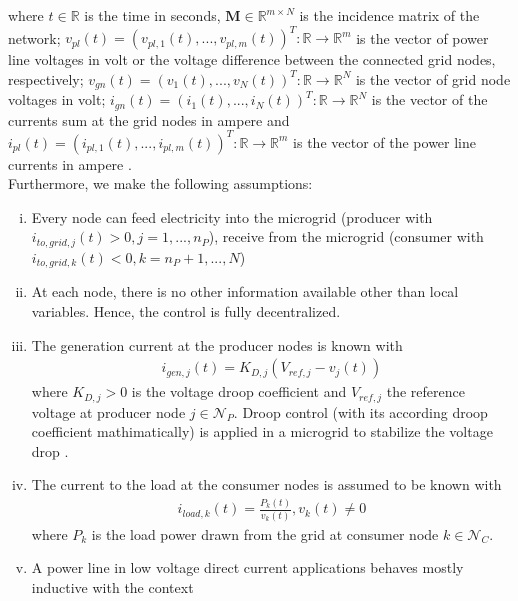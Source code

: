 where $t \in \mathbb{R}$ is the time in seconds, $\boldsymbol{M} \in \mathbb{R}^{m \times N}$ is the incidence matrix of the network; $v_{pl}(t) = (v_{pl,1}(t),...,v_{pl,m}(t))^T: \mathbb{R} \rightarrow \mathbb{R}^m$ is the vector of power line voltages in volt or the voltage difference between the connected grid nodes, respectively; $v_{gn}(t) = (v_{1}(t),...,v_{N}(t))^T: \mathbb{R} \rightarrow \mathbb{R}^N$ is the vector of grid node voltages in volt; $i_{gn}(t) = (i_{1}(t),...,i_{N}(t))^T: \mathbb{R} \rightarrow \mathbb{R}^N$ is the vector of the currents sum at the grid nodes in ampere and $i_{pl}(t) =(i_{pl,1}(t),...,i_{pl,m}(t))^T: \mathbb{R} \rightarrow \mathbb{R}^m$ is the vector of the power line currents in ampere \cite{lia_master}. \\Furthermore, we make the following assumptions:
\begin{enumerate}[i.]
    \item Every node can feed electricity into the microgrid (producer with $i_{to,grid,j}(t) > 0, j = 1,...,n_P$), receive from the microgrid (consumer with $i_{to,grid,k}(t) < 0, k = n_P+1,...,N$) \cite{lia_stability} 
    \item At each node, there is no other information available other than local variables. Hence, the control is fully decentralized.
    \item The generation current at the producer nodes is known with \cite{lia_stability}
    \begin{align}
        i_{gen,j}(t) = K_{D,j}(V_{ref,j} - v_j(t)) \label{eq:i_gen}
    \end{align} where $K_{D,j} > 0$ is the voltage droop coefficient and $V_{ref,j}$ the reference voltage at producer node $j \in \mathcal{N}_P$. Droop control (with its according droop coefficient mathimatically) is applied in a microgrid to stabilize the voltage drop \cite{voltage_droop}. 
    \item The current to the load at the consumer nodes is assumed to be known with \cite{lia_stability}
    \begin{align}
        i_{load,k}(t) = \frac{P_k(t)}{v_k(t)}, v_k(t) \neq 0 \label{eq:i_load}
    \end{align} where $P_k$ is the load power drawn from the grid at consumer node $k \in \mathcal{N}_C$. 
    \item \label{ass:induct} A power line in low voltage direct current applications behaves mostly inductive \cite[p.28]{lia_master} with the context
    \begin{align}

\end{align}
\end{enumerate}

